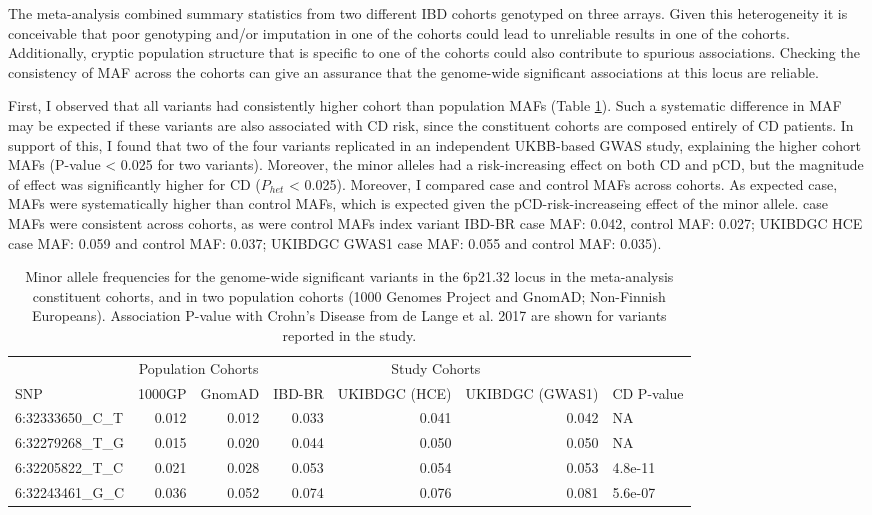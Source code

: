   The meta-analysis combined summary statistics from two different IBD cohorts genotyped on three arrays. Given this heterogeneity it is conceivable that poor genotyping and/or imputation in one of the cohorts could lead to unreliable results in one of the cohorts. Additionally, cryptic population structure that is specific to one of the cohorts could also contribute to spurious associations. Checking the consistency of MAF across the cohorts can give an assurance that the genome-wide significant associations at this locus are reliable. 
  
  
 First, I observed that all variants had consistently higher cohort than population MAFs (Table \ref{tab:table:maf_concord}). Such a systematic difference in MAF may be expected if these variants are also associated with CD risk, since the constituent cohorts are composed entirely of CD patients. In support of this, I found that two of the four variants replicated in an independent UKBB-based GWAS study, explaining the higher cohort MAFs (P-value < 0.025 for two variants). Moreover, the minor alleles had a risk-increasing effect on both CD and pCD, but the magnitude of effect was significantly higher for CD ($P_{het}$ < 0.025). Moreover, I compared case and control MAFs across cohorts. As expected case, MAFs were systematically higher than control MAFs, which is expected given the pCD-risk-increaseing effect of the minor allele. case MAFs were consistent across cohorts, as were control MAFs index variant IBD-BR case MAF: 0.042, control MAF: 0.027; UKIBDGC HCE case MAF: 0.059 and control MAF: 0.037; UKIBDGC GWAS1 case MAF: 0.055 and control MAF: 0.035). 

    \begin{table}[H]

      \caption{\label{tab:table:maf_concord}Minor allele frequencies for the genome-wide significant variants in the 6p21.32 locus in the meta-analysis constituent cohorts, and in two population cohorts (1000 Genomes Project and GnomAD; Non-Finnish Europeans). Association P-value with Crohn's Disease from de Lange et al. 2017 are shown for variants reported in the study.}
      \centering
      \fontsize{9}{11}\selectfont
      \begin{tabular}[t]{lrrrrrl}
      \toprule
      \multicolumn{1}{c}{ } & \multicolumn{2}{c}{Population Cohorts} & \multicolumn{3}{c}{Study Cohorts} & \multicolumn{1}{c}{ } \\
      \cmidrule(l{3pt}r{3pt}){2-3} \cmidrule(l{3pt}r{3pt}){4-6}
      SNP & 1000GP & GnomAD & IBD-BR & UKIBDGC (HCE) & UKIBDGC (GWAS1) & CD P-value\\
      \midrule
      6:32333650\_C\_T & 0.012 & 0.012 & 0.033 & 0.041 & 0.042 & NA\\
      6:32279268\_T\_G & 0.015 & 0.020 & 0.044 & 0.050 & 0.050 & NA\\
      6:32205822\_T\_C & 0.021 & 0.028 & 0.053 & 0.054 & 0.053 & 4.8e-11\\
      6:32243461\_G\_C & 0.036 & 0.052 & 0.074 & 0.076 & 0.081 & 5.6e-07\\
      \bottomrule
      \end{tabular}
      \end{table}
  
